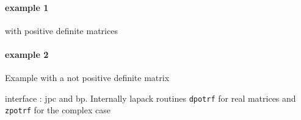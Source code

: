 \begin{examples}
\paragraph{example 1} with positive definite matrices 
  \begin{program}
  \end{program}
  \paragraph{example 2} Example with a not positive definite matrix
  \begin{program}
  \end{program}
\end{examples}

\begin{manseealso}
\end{manseealso}

\begin{authors}
   interface : jpc and bp. Internally lapack routines \verb+dpotrf+ for real matrices 
   and \verb+zpotrf+ for the complex case
\end{authors}


 
 
  

